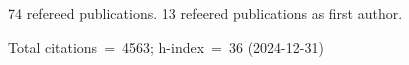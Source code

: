 74 refereed publications. 13 refeered publications as first author.

Total citations~=~4563; h-index~=~36 (2024-12-31)